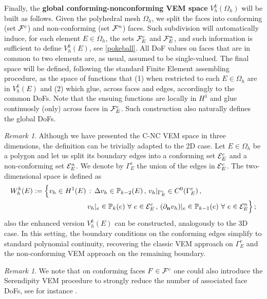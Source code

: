 \documentclass[a4paper,11pt]{article}
\theoremstyle{remark}
\newtheorem{remark}[theorem]{Remark}
\theoremstyle{definition}
\newcommand{\Pol}{\mathbb{P}}
\begin{document}
Finally, the {\bf global conforming-nonconforming VEM space}  $V_h^k(\Omega_h)$ will be built as follows. Given the polyhedral mesh $\Omega_h$, we split the faces into conforming (set ${\cal F}^c$) and non-conforming (set ${\cal F}^n$) faces. Such subdivision will automatically induce, for each element $E \in \Omega_h$, the sets ${\cal F}_E^c$ and ${\cal F}_E^n$, and such information is sufficient to define $V_h^k(E)$, see \eqref{pokeball}. All DoF values on faces that are in common to two elements are, as usual, assumed to be single-valued. The final space will be defined, following the standard Finite Element assembling procedure, as the space of functions that
(1) when restricted to each $E \in \Omega_h$ are in $V_h^k(E)$ and 
(2) which glue, across faces and edges, accordingly to the common DoFs. 
Note that the ensuing functions are locally in $H^1$ and glue continuosly (only) across faces in ${\cal F}_E^c$.
Such construction also naturally defines the global DoFs.

\begin{remark}
Although we have presented the C-NC VEM space in three dimensions, the definition can be trivially adapted to the 2D case. Let $E \in \Omega_h$ be a polygon and let us split its boundary edges into a conforming set ${\cal E}_E^c$ and a non-conforming set ${\cal E}_E^n$. We denote by $\Gamma^c_E$ the union of the edges in ${\cal E}_E^c$. The two-dimensional space is defined as
\begin{equation}
\begin{aligned}
W_h^k(E) := \Big\{ v_h \in H^1(E) \, & :\, \Delta v_h \in \Pol_{k-2}(E) \, , \, 
v_h|_{\Gamma^{c}_E} \in C^0(\Gamma^{c}_E) \, , \\
&v_h|_e \in \Pol_k(e) \ \forall \ e \in {\cal E}^c_E \, , \,
(\partial_{{\bf n}} v_h)|_e \in \Pol_{k-1}(e) \ \forall \ e \in {\cal E}^n_E \Big\} \, ;
\end{aligned}
\end{equation}
also the enhanced version $V_h^k(E)$ can be constructed, analogously to the 3D case. 
In this setting, the boundary conditions on the conforming edges simplify to standard polynomial continuity, recovering the classic VEM approach on $\Gamma^c_E$ and the non-conforming VEM approach on the remaining boundary.
\end{remark}

\begin{remark}
We note that on conforming faces $F \in {\cal F}^c$ one could also introduce the Serendipity VEM procedure to strongly reduce the number of associated face DoFs, see for instance \cite{sere1,sere2}.
\end{remark}
\end{document}

